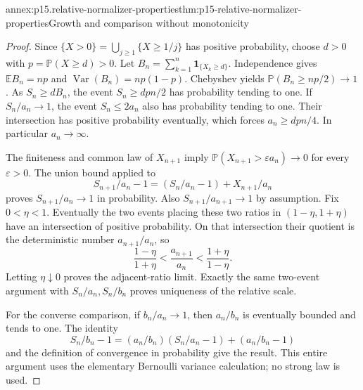 \begin{annexitem}{annex:p15.relative-normalizer-properties}{thm:p15-relative-normalizer-properties}{Growth and comparison without monotonicity}
\begin{proof}
Since \(\{X>0\}=\bigcup_{j\geq1}\{X\geq1/j\}\) has positive
probability, choose \(d>0\) with \(p=\mathbb P(X\geq d)>0\).
Let \(B_n=\sum_{k=1}^n\mathbf1_{\{X_k\geq d\}}\).
Independence gives \(\mathbb EB_n=np\) and
\(\operatorname{Var}(B_n)=np(1-p)\). Chebyshev yields
\(\mathbb P(B_n\geq np/2)\to1\).
As \(S_n\geq dB_n\), the event \(S_n\geq dpn/2\) has
probability tending to one. If \(S_n/a_n\to1\), the event
\(S_n\leq2a_n\) also has probability tending to one.
Their intersection has positive probability eventually, which
forces \(a_n\geq dpn/4\). In particular \(a_n\to\infty\).

The finiteness and common law of \(X_{n+1}\) imply
\(\mathbb P(X_{n+1}>\varepsilon a_n)\to0\) for every
\(\varepsilon>0\). The union bound applied to
\[
 S_{n+1}/a_n-1=(S_n/a_n-1)+X_{n+1}/a_n
\]
proves \(S_{n+1}/a_n\to1\) in probability.
Also \(S_{n+1}/a_{n+1}\to1\) by assumption.
Fix \(0<\eta<1\). Eventually the two events placing these two
ratios in \((1-\eta,1+\eta)\) have an intersection of positive
probability. On that intersection their quotient is the
deterministic number \(a_{n+1}/a_n\), so
\[
 \frac{1-\eta}{1+\eta}<
 \frac{a_{n+1}}{a_n}<
 \frac{1+\eta}{1-\eta}.
\]
Letting \(\eta\downarrow0\) proves the adjacent-ratio limit.
Exactly the same two-event argument with \(S_n/a_n,S_n/b_n\)
proves uniqueness of the relative scale.

For the converse comparison, if \(b_n/a_n\to1\), then \(a_n/b_n\)
is eventually bounded and tends to one. The identity
\[
 S_n/b_n-1=(a_n/b_n)(S_n/a_n-1)+(a_n/b_n-1)
\]
and the definition of convergence in probability give the result.
This entire argument uses the elementary Bernoulli variance
calculation; no strong law is used.
\end{proof}
\end{annexitem}


